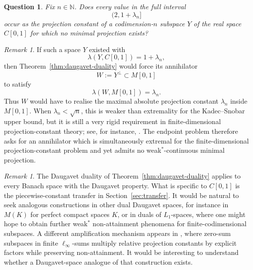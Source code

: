 \documentclass[11pt]{amsart}
\numberwithin{equation}{section}
\newtheorem{question}[theorem]{Question}
\theoremstyle{definition}
\theoremstyle{remark}
\newtheorem{remark}[theorem]{Remark}
\newcommand{\N}{\mathbb N}
\begin{document}
\begin{question}
Fix $n\in\N$. Does every value in the full interval
\[
(2,1+\lambda_n]
\]
occur as the projection constant of a codimension-$n$ subspace $Y$ of the real space $C[0,1]$ for which no minimal projection exists?
\end{question}

\begin{remark}
If such a space $Y$ existed with
\[
\lambda(Y,C[0,1])=1+\lambda_n,
\]
then Theorem~\ref{thm:daugavet-duality} would force its annihilator
\[
W:=Y^\perp\subset M[0,1]
\]
to satisfy
\[
\lambda(W,M[0,1])=\lambda_n.
\]
Thus $W$ would have to realise the maximal absolute projection constant $\lambda_n$ inside $M[0,1]$. When $\lambda_n<\sqrt n$, this is weaker than extremality for the Kadec--Snobar upper bound, but it is still a very rigid requirement in finite-dimensional projection-constant theory; see, for instance, \cite{Grunbaum,KLL,BB22,BB23}. The endpoint problem therefore asks for an annihilator which is simultaneously extremal for the finite-dimensional projection-constant problem and yet admits no weak$^*$-continuous minimal projection.
\end{remark}

\begin{remark}
The Daugavet duality of Theorem~\ref{thm:daugavet-duality} applies to every Banach space with the Daugavet property. What is specific to $C[0,1]$ is the piecewise-constant transfer in Section~\ref{sec:transfer}. It would be natural to seek analogous constructions in other dual Daugavet spaces, for instance in $M(K)$ for perfect compact spaces $K$, or in duals of $L_1$-spaces, where one might hope to obtain further weak$^*$ non-attainment phenomena for finite-codimensional subspaces. A different amplification mechanism appears in \cite{KL26}, where zero-sum subspaces in finite $\ell_\infty$-sums multiply relative projection constants by explicit factors while preserving non-attainment. It would be interesting to understand whether a Daugavet-space analogue of that construction exists.
\end{remark}
\end{document}

